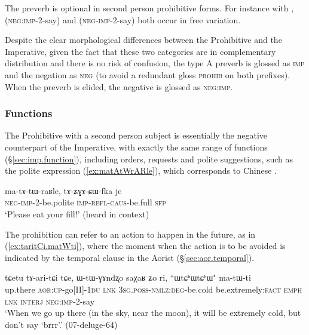 The preverb is optional in second person prohibitive forms. For instance with ,  (\textsc{neg}:\textsc{imp}-2-say) and  (\textsc{neg}-\textsc{imp}-2-say) both occur in free variation.

Despite the clear morphological differences between the Prohibitive and the Imperative, given the fact that these two categories are in complementary distribution and there is no risk of confusion, the type A preverb is glossed as \textsc{imp} and the negation as \textsc{neg} (to avoid a redundant gloss \textsc{prohib} on both prefixes).  When the preverb is elided, the negative  is glossed as \textsc{neg}:\textsc{imp}.
 
\subsubsection{Functions} \label{sec:prohib.function}
The Prohibitive with a second person subject is essentially the negative counterpart of the Imperative, with exactly the same range of functions (§\ref{sec:imp.function}), including orders,  requests and polite suggestions, such as the polite expression  (\ref{ex:matAtWrARle}), which corresponds to Chinese .

\begin{exe}
\ex  \label{ex:matAtWrARle}
\gll ma-tɤ-tɯ-raʁle, tɤ-ʑɣɤ-ɕɯ-fka je\\
\textsc{neg}-\textsc{imp}-2-be.polite \textsc{imp}-\textsc{refl}-\textsc{caus}-be.full \textsc{sfp} \\
\glt `Please eat your fill!' (heard in context)
\end{exe}

The prohibition can refer to an action to happen in the future, as in (\ref{ex:taritCi.matWti}), where the moment when the action is to be avoided is indicated by the temporal clause in the Aorist (§\ref{sec:aor.temporal}).

\begin{exe}
\ex  \label{ex:taritCi.matWti}
\gll tɕetu tɤ-ari-tɕi tɕe, ɯ-tɯ-ɣɤndʐo saχaʁ ʑo ri, ``ɯtɕʰɯtɕʰɯ" ma-tɯ-ti \\
up.there \textsc{aor}:\textsc{up}-go[II]-\textsc{1du} \textsc{lnk} \textsc{3sg}.\textsc{poss}-\textsc{nmlz}:\textsc{deg}-be.cold be.extremely:\textsc{fact} \textsc{emph} \textsc{lnk} \textsc{interj} \textsc{neg}:\textsc{imp}-2-say \\
\glt `When we go up there (in the sky, near the moon), it will be extremely cold, but don't say `brrr'.' (07-deluge-64) 
\end{exe}
 
